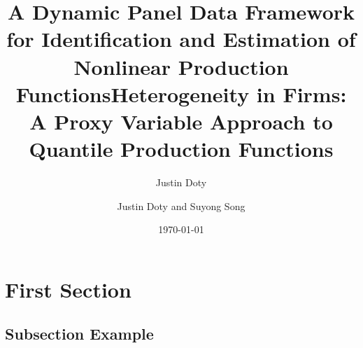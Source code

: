 \documentclass{beamer}
\title[Nonlinear Production Functions]{A Dynamic Panel Data Framework for Identification and Estimation of Nonlinear Production Functions}
\author{Justin Doty} %
\institute[University of Iowa] %
\title[Quantile Production Functions]{Heterogeneity in Firms:\\
A Proxy Variable Approach to Quantile Production Functions}
\author{Justin Doty and Suyong Song} %
\institute[] %
\date{\today} %
\begin{document}
\begin{frame}
\titlepage %
\end{frame}


\section{First Section} %

\subsection{Subsection Example} %
\end{document}
